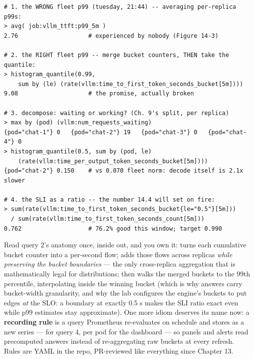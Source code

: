 \begin{terminalbox}
\begin{Verbatim}[breaklines=true,breakanywhere=true,fontsize=\small,formatcom=\color{tbbtermfg},codes=\tbbcodeactive]
# 1. the WRONG fleet p99 (tuesday, 21:44) -- averaging per-replica p99s:
> avg( job:vllm_ttft:p99_5m )
2.76                    # experienced by nobody (Figure 14-3)

# 2. the RIGHT fleet p99 -- merge bucket counters, THEN take the quantile:
> histogram_quantile(0.99,
    sum by (le) (rate(vllm:time_to_first_token_seconds_bucket[5m])))
9.08                    # the promise, actually broken

# 3. decompose: waiting or working? (Ch. 9's split, per replica)
> max by (pod) (vllm:num_requests_waiting)
{pod="chat-1"} 0   {pod="chat-2"} 19   {pod="chat-3"} 0   {pod="chat-4"} 0
> histogram_quantile(0.5, sum by (pod, le)
    (rate(vllm:time_per_output_token_seconds_bucket[5m])))
{pod="chat-2"} 0.150    # vs 0.070 fleet norm: decode itself is 2.1x slower

# 4. the SLI as a ratio -- the number 14.4 will set on fire:
> sum(rate(vllm:time_to_first_token_seconds_bucket{le="0.5"}[5m]))
  / sum(rate(vllm:time_to_first_token_seconds_count[5m]))
0.762                   # 76.2% good this window; target 0.990
\end{Verbatim}
\end{terminalbox}

Read query 2’s anatomy once, inside out, and you own it:  turns each cumulative bucket counter into a per-second flow;  adds those flows across replicas \textit{while preserving the bucket boundaries} — the only cross-replica aggregation that is mathematically legal for distributions;  then walks the merged buckets to the 99th percentile, interpolating inside the winning bucket (which is why answers carry bucket-width granularity, and why the lab configures the engine’s buckets to put edges \textit{at} the SLO: a boundary at exactly 0.5 s makes the SLI ratio exact even while p99 estimates stay approximate). One more idiom deserves its name now: a \textbf{recording rule} is a query Prometheus re-evaluates on schedule and stores as a new series —  for query 4,  per pod for the dashboard — so panels and alerts read precomputed answers instead of re-aggregating raw buckets at every refresh. Rules are YAML in the repo, PR-reviewed like everything since Chapter 13.

